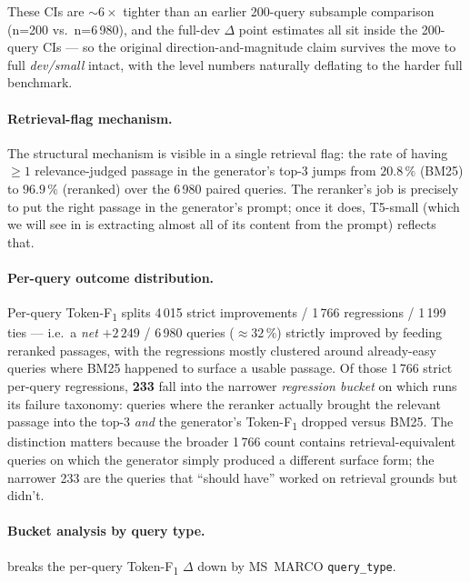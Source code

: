 \documentclass[11pt,a4paper]{article}
\newcommand{\devsmall}{\textit{dev/small}}
\newcommand{\fdev}{6\,980}
\newcommand{\msmarco}{MS~MARCO}
\newcommand{\F}{F\textsubscript{1}}
\newcommand{\Tokenf}{Token-\F}
\newcommand{\bmtwofive}{BM25}
\begin{document}
These CIs are $\sim\!6\times$ tighter than an earlier
200-query subsample comparison (n=200 vs.\ n=\fdev{}), and the
full-dev $\Delta$ point estimates all sit inside the 200-query CIs
--- so the original direction-and-magnitude claim survives the move
to full \devsmall{} intact, with the level numbers naturally
deflating to the harder full benchmark.

\paragraph{Retrieval-flag mechanism.}  The structural mechanism is
visible in a single retrieval flag: the rate of having $\geq\!1$
relevance-judged passage in the generator's top-3 jumps from
$\mathbf{20.8\,\%}$ (\bmtwofive{}) to $\mathbf{96.9\,\%}$ (reranked)
over the \fdev{} paired queries.  The reranker's job is precisely
to put the right passage in the generator's prompt; once it does,
T5-small (which we will see in  is extracting almost
all of its content from the prompt) reflects that.

\paragraph{Per-query outcome distribution.}  Per-query \Tokenf{}
splits 4\,015 strict improvements / 1\,766 regressions / 1\,199
ties --- i.e.\ a \emph{net} $+2\,249$ / \fdev{} queries
($\approx\!32\,\%$) strictly improved by feeding reranked passages,
with the regressions mostly clustered around already-easy queries
where \bmtwofive{} happened to surface a usable passage.  Of those
1\,766 strict per-query regressions, \textbf{233} fall into the
narrower \emph{regression bucket} on which  runs its
failure taxonomy: queries where the reranker actually brought the
relevant passage into the top-3 \emph{and} the generator's
\Tokenf{} dropped versus \bmtwofive{}.  The distinction matters
because the broader 1\,766 count contains retrieval-equivalent
queries on which the generator simply produced a different surface
form; the narrower 233 are the queries that ``should have'' worked
on retrieval grounds but didn't.

\paragraph{Bucket analysis by query type.}  
breaks the per-query \Tokenf{} $\Delta$ down by \msmarco{}
\texttt{query\_type}.
\end{document}
